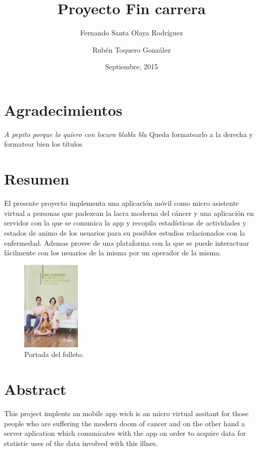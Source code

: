 \documentclass[b5paper,10pt,twoside]{book}
\title{Proyecto Fin carrera}
\author{Fernando Santa Olaya Rodríguez \\
	\and 
	Rubén Toquero González}
\date{Septiembre, 2015}
\begin{document}
	\maketitle
	
	\chapter*{Agradecimientos}
	\textit{A pepito porque lo quiero con locura blabla bla} Queda formatearlo a la derecha y  formatear bien los títulos
	

	\chapter*{Resumen}
	 	El presente proyecto implementa una aplicación móvil como micro asistente virtual a personas que padezcan la lacra moderna del cáncer y una aplicación en servidor con la que se comunica la app y recopila estadísticas de actividades y estados de animo de los usuarios para su posibles estudios relacionados con la enfermedad. Ademas provee de una plataforma con la que se puede interactuar fácilmente con los usuarios de la misma por un operador de la misma. 
	 	
	\begin{figure}[h]
		\centering
		\includegraphics[width=0.25\textwidth]{fotointro}
		\caption{Portada del folleto.}
		\label{fig:mesh1}
	\end{figure}
	 
	\chapter*{Abstract}
	 	This project implents an mobile app wich is an micro virtual assitant for those people who are suffering the modern doom of cancer and on the other hand a server aplication which comunicates with the app on order to acquire data for statistic uses of the data involved with this illnes.\cite{SHAREESP}
	
	\tableofcontents
	
\end{document}
